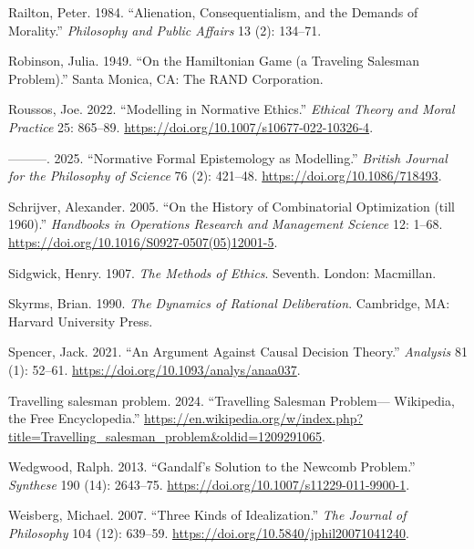 \documentclass[
  12pt,
  letterpaper,
  DIV=11,
  numbers=noendperiod,
  twoside]{scrartcl}
\newlength{\cslhangindent}
\newenvironment{CSLReferences}[2] %
 {\begin{list}{}{%
  \setlength{\itemindent}{0pt}
  \setlength{\leftmargin}{0pt}
  \setlength{\parsep}{0pt}
  \ifodd #1
   \setlength{\leftmargin}{\cslhangindent}
   \setlength{\itemindent}{-1\cslhangindent}
  \fi
  \setlength{\itemsep}{#2\baselineskip}}}
 {\end{list}}
\begin{document}
\begin{CSLReferences}{1}{0}
Railton, Peter. 1984. {``Alienation, Consequentialism, and the Demands
of Morality.''} \emph{Philosophy and Public Affairs} 13 (2): 134--71.

Robinson, Julia. 1949. {``On the Hamiltonian Game (a Traveling Salesman
Problem).''} Santa Monica, CA: The RAND Corporation.

Roussos, Joe. 2022. {``Modelling in Normative Ethics.''} \emph{Ethical
Theory and Moral Practice} 25: 865--89.
\url{https://doi.org/10.1007/s10677-022-10326-4}.

---------. 2025. {``Normative Formal Epistemology as Modelling.''}
\emph{British Journal for the Philosophy of Science} 76 (2): 421--48.
\url{https://doi.org/10.1086/718493}.

Schrijver, Alexander. 2005. {``On the History of Combinatorial
Optimization (till 1960).''} \emph{Handbooks in Operations Research and
Management Science} 12: 1--68.
\url{https://doi.org/10.1016/S0927-0507(05)12001-5}.

Sidgwick, Henry. 1907. \emph{The Methods of Ethics}. Seventh. London:
Macmillan.

Skyrms, Brian. 1990. \emph{The Dynamics of Rational Deliberation}.
Cambridge, MA: Harvard University Press.

Spencer, Jack. 2021. {``An Argument Against Causal Decision Theory.''}
\emph{Analysis} 81 (1): 52--61.
\url{https://doi.org/10.1093/analys/anaa037}.

Travelling salesman problem. 2024. {``Travelling Salesman Problem---
{W}ikipedia{,} the Free Encyclopedia.''}
\url{https://en.wikipedia.org/w/index.php?title=Travelling_salesman_problem&oldid=1209291065}.

Wedgwood, Ralph. 2013. {``Gandalf's Solution to the Newcomb Problem.''}
\emph{Synthese} 190 (14): 2643--75.
\url{https://doi.org/10.1007/s11229-011-9900-1}.

Weisberg, Michael. 2007. {``Three Kinds of Idealization.''} \emph{The
Journal of Philosophy} 104 (12): 639--59.
\url{https://doi.org/10.5840/jphil20071041240}.

\end{CSLReferences}
\end{document}
